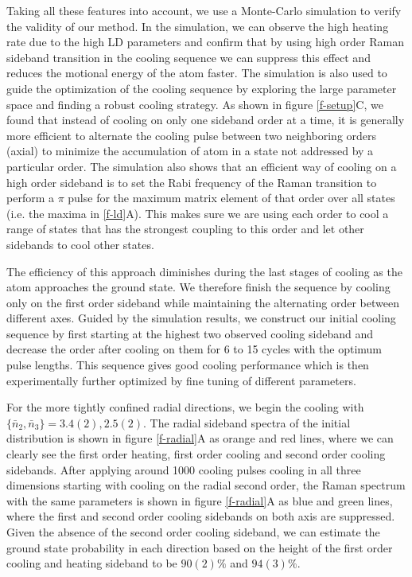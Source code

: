 \documentclass[aps,prl,twocolumn,groupedaddress]{revtex4-1}
\begin{document}
Taking all these features into account, we use a Monte-Carlo simulation to verify
the validity of our method.
In the simulation, we can observe the high heating rate due to the high LD parameters
and confirm that by using high order Raman sideband transition in the cooling sequence we can
suppress this effect and reduces the motional energy of the atom faster.
The simulation is also used to guide the optimization of the cooling sequence by exploring the
large parameter space and finding a robust cooling strategy.
As shown in figure \ref{f-setup}C, we found that instead of cooling on only one sideband order
at a time, it is generally more efficient to alternate the cooling pulse between two
neighboring orders (axial) to minimize the accumulation of atom in a state
not addressed by a particular order.
The simulation also shows that an efficient way of cooling on a high order sideband is
to set the Rabi frequency of the Raman transition to perform a $\pi$ pulse for the maximum matrix element of that order over all states (i.e. the maxima in \ref{f-ld}A).
This makes sure we are using each order to cool a range of states that has the strongest
coupling to this order and let other sidebands to cool other states.

The efficiency of this approach diminishes during the last stages of cooling as the atom approaches the ground state.  We therefore finish the sequence by cooling only on the first order sideband while maintaining the alternating order between different axes.
Guided by the simulation results, we construct our initial cooling sequence by first starting
at the highest two observed cooling sideband and decrease the order after cooling on them
for 6 to 15 cycles with the optimum pulse lengths.
This sequence gives good cooling performance which is then experimentally further optimized
by fine tuning of different parameters.

For the more tightly confined radial directions,
we begin the cooling with $\{\bar n_2, \bar n_3\}=3.4(2), 2.5(2)$.
The radial sideband spectra of the initial distribution is shown in figure \ref{f-radial}A
as orange and red lines, where we can clearly see the first order heating,
first order cooling and second order cooling sidebands.
After applying around 1000 cooling pulses cooling in all three dimensions
starting with cooling on the radial second order,
the Raman spectrum with the same parameters is shown in figure \ref{f-radial}A as
blue and green lines, where the first and second order cooling sidebands
on both axis are suppressed.
Given the absence of the second order cooling sideband,
we can estimate the ground state probability in each direction based on the height of
the first order cooling and heating sideband to be $90(2)\%$ and $94(3)\%$.
\end{document}
